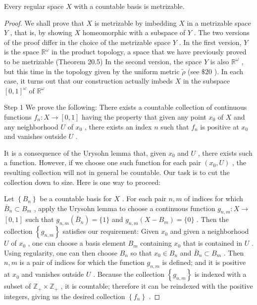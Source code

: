 \begin{theorem}
	Every regular space \(X\) with a countable basis is metrizable.

\end{theorem}
\begin{proof}
We shall prove that \(X\) is metrizable by imbedding \(X\) in a metrizable space \(Y\) , that is, by showing \(X\) homeomorphic with a subspace of \(Y\) . The two versions of the proof differ in the choice of the metrizable space \(Y\) . In the first version, \(Y\) is the space \({\mathbb{R}}^{\omega }\) in the product topology, a space that we have previously proved to be metrizable (Theorem 20.5) In the second version, the space \(Y\) is also \({\mathbb{R}}^{\omega }\) , but this time in the topology given by the uniform metric \(\widetilde{\rho }\) (see \(\$ {20}\) ). In each case, it turns out that our construction actually imbeds \(X\) in the subspace \({\left\lbrack  0,1\right\rbrack  }^{\omega }\) of \({\mathbb{R}}^{\omega }\)

Step 1 We prove the following: There exists a countable collection of continuous functions \({f}_{n} : X \rightarrow  \left\lbrack  {0,1}\right\rbrack\) having the property that given any point \({x}_{0}\) of \(X\) and any neighborhood \(U\) of \({x}_{0}\) , there exists an index \(n\) such that \({f}_{n}\) is positive at \({x}_{0}\) and vanishes outside \(U\) .

It is a consequence of the Urysohn lemma that, given \({x}_{0}\) and \(U\) , there exists such a function. However, if we choose one such function for each pair \(\left( {{x}_{0},U}\right)\) , the resulting collection will not in general be countable. Our task is to cut the collection down to size. Here is one way to proceed:

Let \(\left\{  {B}_{n}\right\}\) be a countable basis for \(X\) . For each pair \(n,m\) of indices for which \({\bar{B}}_{n} \subset  {B}_{m}\) , apply the Urysohn lemma to choose a continuous function \({g}_{n,m} : X \rightarrow\)  \(\left\lbrack  {0,1}\right\rbrack\) such that \({g}_{n,m}\left( {\bar{B}}_{n}\right)  = \{ 1\}\) and \({g}_{n,m}\left( {X - {B}_{m}}\right)  = \{ 0\}\) . Then the collection \(\left\{  {g}_{n,m}\right\}\) satisfies our requirement: Given \({x}_{0}\) and given a neighborhood \(U\) of \({x}_{0}\) , one can choose a basis element \({B}_{m}\) containing \({x}_{0}\) that is contained in \(U\) . Using regularity, one can then choose \({B}_{n}\) so that \({x}_{0} \in  {B}_{n}\) and \({\bar{B}}_{n} \subset  {B}_{m}\) . Then \(n,m\) is a pair of indices for which the function \({g}_{n,m}\) is defined; and it is positive at \({x}_{0}\) and vanishes outside \(U\) . Because the collection \(\left\{  {g}_{n,m}\right\}\) is indexed with a subset of \({\mathbb{Z}}_{ + } \times  {\mathbb{Z}}_{ + }\) , it is countable; therefore it can be reindexed with the positive integers, giving us the desired collection \(\left\{  {f}_{n}\right\}\) .


\end{proof}
